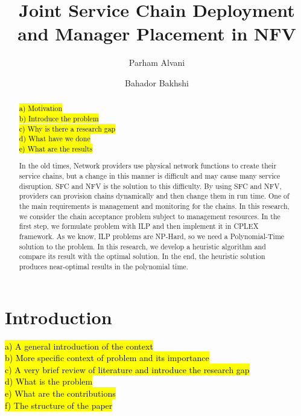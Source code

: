 \documentclass[preprint,review,12pt]{elsarticle}
\newcommand{\hly}[2][yellow]{
  {\sethlcolor{#1} \hl{#2}}
}
\begin{document}
\begin{frontmatter}

\title{Joint Service Chain Deployment and Manager Placement in NFV}

\author[aut]{Parham Alvani
}
\author[aut]{Bahador Bakhshi
}


\address[aut]{Amirkabir University of Technology, Tehran, Iran}

\begin{abstract}
\hly{%
a) Motivation \\
b) Introduce the problem \\
c) Why is there a research gap \\
d) What have we done \\
e) What are the results \\
}

In the old times, Network providers use physical network functions to create their service chains, but a change in this manner is difficult and may cause many service disruption.
SFC and NFV is the solution to this difficulty. By using SFC and NFV, providers can provision chains dynamically and then change them in run time.
One of the main requirements is management and monitoring for the chains.
In this research, we consider the chain acceptance problem subject to management resources. In the first step, we formulate
problem with ILP and then implement it in CPLEX framework. As we know, ILP problems are NP-Hard, so we need a Polynomial-Time solution to the problem.
In this research, we develop a heuristic algorithm and compare its result with the optimal solution. In the end, the heuristic solution produces near-optimal results in the polynomial time.
\end{abstract}

\begin{keyword}
\end{keyword}

\end{frontmatter}

\section{Introduction}
\hly{%
a) A general introduction of the context \\
b) More specific context of problem and its importance \\
c) A very brief review of literature and introduce the research gap \\
d) What is the problem \\
e) What are the contributions \\
f) The structure of the paper \\
}

\end{document}
